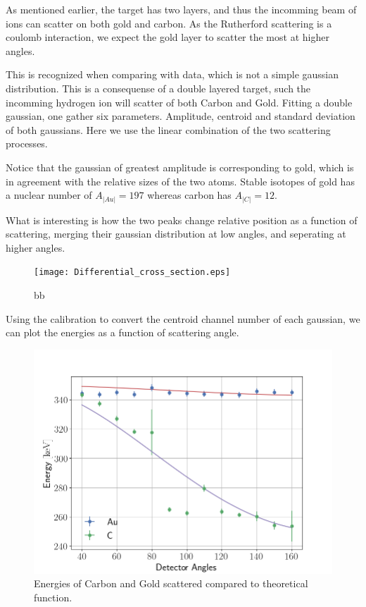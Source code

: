 As mentioned earlier, the target has two layers, and thus the incomming beam of
ions can scatter on both gold and carbon. As the Rutherford scattering is a
coulomb interaction, we expect the gold layer to scatter the most at higher angles.

This is recognized when comparing with data, which is not a simple gaussian
distribution. This is a consequense of a double layered target, such the
incomming hydrogen ion will scatter of both Carbon and Gold. Fitting a double
gaussian, one gather six parameters. Amplitude, centroid and standard deviation
of both gaussians. Here we use the linear combination of the two scattering
processes. 

Notice that the gaussian of greatest amplitude is corresponding to gold, which
is in agreement with the relative sizes of the two atoms. Stable isotopes of
gold has a nuclear number of $A_|Au| = 197$ whereas carbon has $A_|C| = 12$.

What is interesting is how the two peaks change relative position as a
function of scattering, merging their gaussian distribution at low angles, and
seperating at higher angles.

%


\begin{figure}[h]
	\centering
		\texttt{[image: Differential\_cross\_section.eps]}
	\caption{bb}
	\label{fig:Differential_cross_section}
\end{figure}

Using the calibration to convert the centroid channel number of each gaussian,
we can plot the energies as a function of scattering angle.

\begin{figure}[h!]
\centering
\includegraphics[width=0.99\columnwidth]{fig_energy}
\caption{Energies of Carbon and Gold scattered compared to theoretical
function.}
\label{fig_energy}
\end{figure}




\newpage
